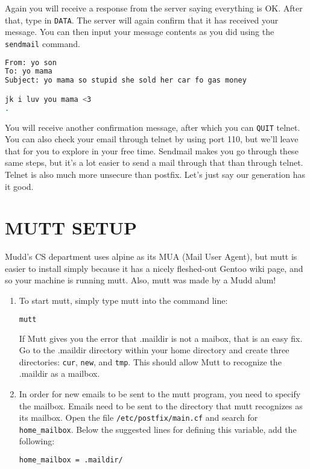 \documentclass{article}
\begin{document}
Again you will receive a response from the server saying everything is OK. After that, type in \verb|DATA|. The server will again confirm that it has received your message. You can then input your message contents as you did using the \verb|sendmail| command.  

\begin{lstlisting}[basicstyle=\ttfamily, backgroundcolor = \color{lightgray}, language = bash, xleftmargin = 0cm, framexleftmargin = 1em]
From: yo son
To: yo mama
Subject: yo mama so stupid she sold her car fo gas money

jk i luv you mama <3         
.
\end{lstlisting}

You will receive another confirmation message, after which you can \verb|QUIT| telnet. You can also check your email through telnet by using port 110, but we'll leave that for you to explore in your free time. Sendmail makes you go through these same steps, but it's a lot easier to send a mail through that than through telnet. Telnet is also much more unsecure than postfix. Let's just say our generation has it good. 



\section*{MUTT SETUP}

\indent\indent Mudd's CS department uses alpine as its MUA (Mail User Agent), but mutt is easier to install simply because it has a nicely fleshed-out Gentoo wiki page, and so your machine is running mutt. Also, mutt was made by a Mudd alum! 

\begin{enumerate}

\item To start mutt, simply type mutt into the command line:

\begin{lstlisting}[basicstyle=\ttfamily, backgroundcolor = \color{lightgray}, language = bash, xleftmargin = 0cm, framexleftmargin = 1em]
mutt
\end{lstlisting}

If Mutt gives you the error that .maildir is not a maibox, that is an easy fix. Go to the .maildir directory within your home directory and create three directories: \verb|cur|, \verb|new|, and \verb|tmp|. This should allow Mutt to recognize the .maildir as a mailbox.

\item In order for new emails to be sent to the mutt program, you need to specify the mailbox. Emails need to be sent to the directory that mutt recognizes as its mailbox. Open the file \verb|/etc/postfix/main.cf| and search for \verb|home_mailbox|. Below the suggested lines for defining this variable, add the following:

\begin{lstlisting}[basicstyle=\ttfamily, backgroundcolor = \color{lightgray}, language = bash, xleftmargin = 0cm, framexleftmargin = 1em]
home_mailbox = .maildir/
\end{lstlisting}

\end{enumerate}
\end{document}
